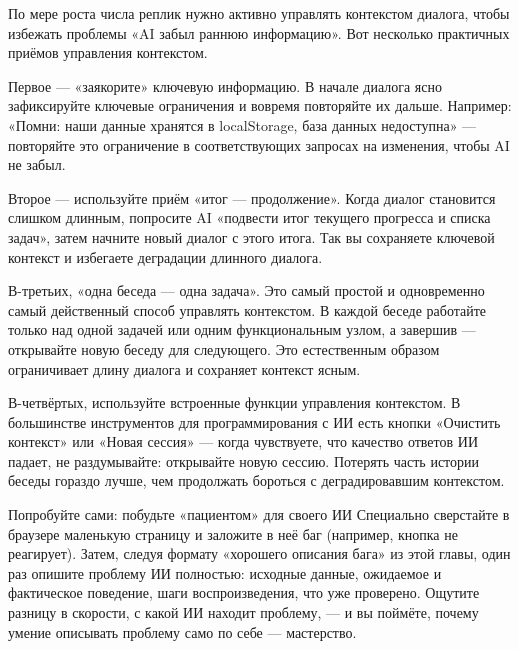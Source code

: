 
По мере роста числа реплик нужно активно управлять контекстом диалога, чтобы избежать проблемы «AI забыл раннюю информацию». Вот несколько практичных приёмов управления контекстом.

Первое — «заякорите» ключевую информацию. В начале диалога ясно зафиксируйте ключевые ограничения и вовремя повторяйте их дальше. Например: «Помни: наши данные хранятся в localStorage, база данных недоступна» — повторяйте это ограничение в соответствующих запросах на изменения, чтобы AI не забыл.

Второе — используйте приём «итог — продолжение». Когда диалог становится слишком длинным, попросите AI «подвести итог текущего прогресса и списка задач», затем начните новый диалог с этого итога. Так вы сохраняете ключевой контекст и избегаете деградации длинного диалога.

В-третьих, «одна беседа — одна задача». Это самый простой и одновременно самый действенный способ управлять контекстом. В каждой беседе работайте только над одной задачей или одним функциональным узлом, а завершив — открывайте новую беседу для следующего. Это естественным образом ограничивает длину диалога и сохраняет контекст ясным.

В-четвёртых, используйте встроенные функции управления контекстом. В большинстве инструментов для программирования с ИИ есть кнопки «Очистить контекст» или «Новая сессия» — когда чувствуете, что качество ответов ИИ падает, не раздумывайте: открывайте новую сессию. Потерять часть истории беседы гораздо лучше, чем продолжать бороться с деградировавшим контекстом.

\begin{tcbpractice}{Попробуйте сами: побудьте «пациентом» для своего ИИ}
Специально сверстайте в браузере маленькую страницу и заложите в неё баг (например, кнопка не реагирует). Затем, следуя формату «хорошего описания бага» из этой главы, один раз опишите проблему ИИ полностью: исходные данные, ожидаемое и фактическое поведение, шаги воспроизведения, что уже проверено. Ощутите разницу в скорости, с какой ИИ находит проблему, — и вы поймёте, почему умение описывать проблему само по себе — мастерство.

\end{tcbpractice}


